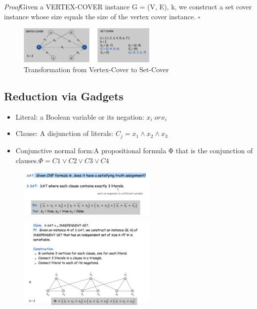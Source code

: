 \documentclass[11pt]{article}
\newenvironment{proof}[1]{\par\textit{Proof}\space#1}{\hfill\ensuremath{\square}}
\begin{document}
\begin{proof}
Given a VERTEX-COVER instance G = (V, E), k, we construct a set cover instance whose size equals the size of the vertex cover instance.
\end{proof}

\begin{figure}[H]
		\centering
		\includegraphics[width=0.6\textwidth ]{vertexSet}
		\caption{Transformation from Vertex-Cover to Set-Cover}
\end{figure}

\subsection{Reduction via Gadgets}

\begin{itemize}
\item{Literal: a Boolean variable or its negation: $x_{i} \; or x_{i}$}
\item{Clause: A disjunction of literals: $C_{j} =x_{1} \land x_{2}  \land x_{3}$}
\item{Conjunctive normal form:A propositional formula Φ that is the conjunction of clauses.$ Φ= C1 \lor C2 \lor C3 \lor C4$}
\end{itemize}

\begin{figure}[H]
		\centering
		\includegraphics[width=0.6\textwidth ]{sat}
\end{figure}

\begin{figure}[H]
		\centering
		\includegraphics[width=0.6\textwidth ]{indsat}
\end{figure}
\end{document}
